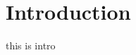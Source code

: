 \documentclass[../main.tex]{subfiles}
\begin{document}
\section{Introduction} \label{sec:intro}
this is intro
\end{document}
